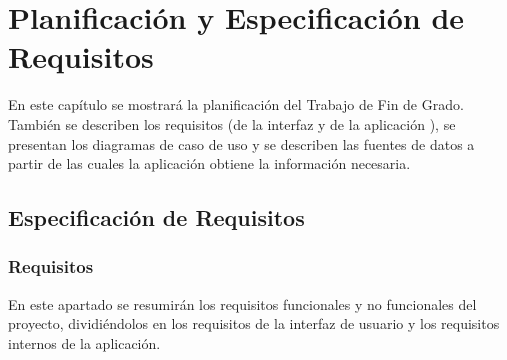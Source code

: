\chapter{Planificación y Especificación de Requisitos}
En este capítulo se mostrará la planificación del Trabajo de Fin de Grado. También se describen los requisitos (de la interfaz y de la aplicación ), se presentan los diagramas de caso de uso y se describen	las fuentes de datos a partir de las cuales la aplicación obtiene la información necesaria.


\section{Especificación de  Requisitos}
\subsection[Requisitos]{Requisitos}
En este apartado se resumirán los requisitos funcionales y no funcionales del proyecto, dividiéndolos en los requisitos de la interfaz de usuario y los requisitos internos de la aplicación.
